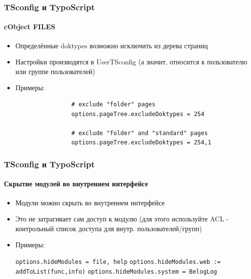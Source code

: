 
\begin{frame}[fragile]
	\frametitle{TSconfig и TypoScript}
	\framesubtitle{cObject FILES}

	\begin{itemize}

		\item Определённые doktypes возможно исключить из дерева страниц
		\item Настройки производятся в UserTSconfig (а значит, относится к пользователю или группе пользователей)
		\item Примеры:

			\begin{lstlisting}
				# exclude "folder" pages
				options.pageTree.excludeDoktypes = 254

				# exclude "folder" and "standard" pages
				options.pageTree.excludeDoktypes = 254,1
			\end{lstlisting}

	\end{itemize}

\end{frame}


\begin{frame}[fragile]
	\frametitle{TSconfig и TypoScript}
	\framesubtitle{Скрытие модулей во внутреннем интерфейсе}

	\begin{itemize}

		\item Модули можно скрыть во внутреннем интерфейсе
		\item Это не затрагивает сам доступ к модулю\newline
			(для этого используйте ACL - контрольный список доступа для внутр. пользователей/групп)
		\item Примеры:

			\lstinline!options.hideModules = file, help!
			\lstinline!options.hideModules.web := addToList(func,info)!
			\lstinline!options.hideModules.system = BelogLog!

	\end{itemize}

\end{frame}

